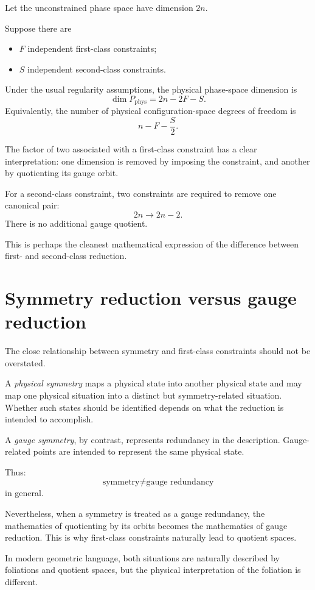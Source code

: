 Let the unconstrained phase space have dimension $2n$.

Suppose there are
\begin{itemize}
\item $F$ independent first-class constraints;
\item $S$ independent second-class constraints.
\end{itemize}
Under the usual regularity assumptions, the physical phase-space dimension is
\[
        \boxed{
        \dim P_{\mathrm{phys}}
        =
        2n-2F-S.
        }
\]
Equivalently, the number of physical configuration-space degrees of freedom is
\[
        \boxed{
        n-F-\frac{S}{2}.
        }
\]

The factor of two associated with a first-class constraint has a clear
interpretation:
one dimension is removed by imposing the constraint, and another by
quotienting its gauge orbit.

For a second-class constraint, two constraints are required to remove one
canonical pair:
\[
        2n\longrightarrow 2n-2.
\]
There is no additional gauge quotient.

This is perhaps the cleanest mathematical expression of the difference between
first- and second-class reduction.

\section{Symmetry reduction versus gauge reduction}

The close relationship between symmetry and first-class constraints should not
be overstated.

A \emph{physical symmetry} maps a physical state into another physical state
and may map one physical situation into a distinct but symmetry-related
situation.  Whether such states should be identified depends on what the
reduction is intended to accomplish.

A \emph{gauge symmetry}, by contrast, represents redundancy in the
description.  Gauge-related points are intended to represent the same
physical state.

Thus:
\[
        \text{symmetry} \neq \text{gauge redundancy}
\]
in general.

Nevertheless, when a symmetry is treated as a gauge redundancy, the
mathematics of quotienting by its orbits becomes the mathematics of gauge
reduction.  This is why first-class constraints naturally lead to quotient
spaces.

In modern geometric language, both situations are naturally described by
foliations and quotient spaces, but the physical interpretation of the
foliation is different.


